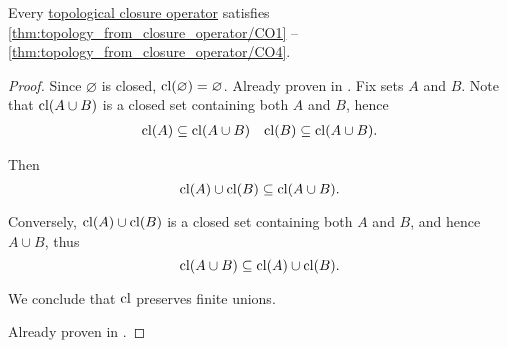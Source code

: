 \begin{proposition}\label{thm:topological_closure_operator_can_generate_topology}
  Every \hyperref[def:topological_closure_operator]{topological closure operator} satisfies \ref{thm:topology_from_closure_operator/CO1} -- \ref{thm:topology_from_closure_operator/CO4}.
\end{proposition}
\begin{proof}
   Since \( \varnothing \) is closed, \( \operatorname{cl}(\varnothing) = \varnothing \).
   Already proven in .
   Fix sets \( A \) and \( B \). Note that \( \operatorname{cl}(A \cup B) \) is a closed set containing both \( A \) and \( B \), hence
  \begin{align*}
    \operatorname{cl}(A) \subseteq \operatorname{cl}(A \cup B)
    &&
    \operatorname{cl}(B) \subseteq \operatorname{cl}(A \cup B).
  \end{align*}

  Then
  \begin{equation*}
    \operatorname{cl}(A) \cup \operatorname{cl}(B) \subseteq \operatorname{cl}(A \cup B).
  \end{equation*}

  Conversely, \( \operatorname{cl}(A) \cup \operatorname{cl}(B) \) is a closed set containing both \( A \) and \( B \), and hence \( A \cup B \), thus
  \begin{equation*}
    \operatorname{cl}(A \cup B) \subseteq \operatorname{cl}(A) \cup \operatorname{cl}(B).
  \end{equation*}

  We conclude that \( \operatorname{cl} \) preserves finite unions.

   Already proven in .
\end{proof}

